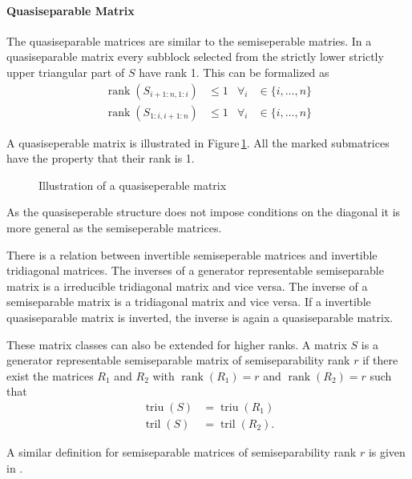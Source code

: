\documentclass[doctype=mastersthesis,BCOR=15mm,biblatex]{ldvbook}%
\DeclareMathOperator{\rank}{rank}
\DeclareMathOperator{\triu}{triu}
\DeclareMathOperator{\tril}{tril}
\begin{document}
\paragraph{Quasiseparable Matrix}
The quasiseparable matrices are similar to the semiseperable matries. In a quasiseparable matrix every subblock selected from the strictly lower strictly upper triangular part of $S$ have rank 1. 
This can be formalized as 
\begin{align}
\rank(S_{i+1:n,1:i}) &\leq 1 & \forall_i &\in\{i,\dots,n\}\\
\rank(S_{1:i,i+1:n}) &\leq 1 & \forall_i &\in\{i,\dots,n\}
\end{align}

A quasiseperable matrix is illustrated in Figure\,\ref{fig:quasiseperable}. All the marked submatrices have the property that their rank is 1.
\begin{figure}
	\centering
	
	\caption{Illustration of a quasiseperable matrix}
	\label{fig:quasiseperable}
\end{figure}
As the quasiseperable structure does not impose conditions on the diagonal it is more general as the semiseperable matrices.

There is a relation between invertible semiseperable matrices and invertible tridiagonal matrices.
The inverses of a generator representable semiseparable matrix is a irreducible tridiagonal matrix and vice versa. 
The inverse of a semiseparable matrix is a tridiagonal matrix and vice versa.
If a invertible quasiseparable matrix is inverted, the inverse is again a quasiseparable matrix.

These matrix classes can also be extended for higher ranks.
A matrix $S$ is a generator representable semiseparable matrix of semiseparability rank $r$ if there exist the matrices $R_1$ and $R_2$ with $\rank(R_1)=r$ and $\rank(R_2)=r$ such that
\begin{align}
\triu(S) &= \triu(R_1)\\
\tril(S) &= \tril(R_2)
.
\end{align}

A similar definition for semiseparable matrices of semiseparability rank $r$ is given in \cite{vandebril_bibliography_2005}.
\end{document}
